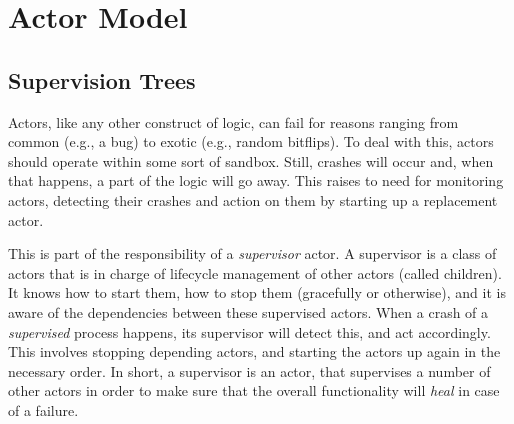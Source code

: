 \section{Actor Model}




\subsection{Supervision Trees}

Actors, like any other construct of logic, can fail for reasons ranging from common (e.g., a bug) to exotic (e.g., random bitflips). To deal with this, actors should operate within some sort of sandbox. Still, crashes will occur and, when that happens, a part of the logic will go away. This raises to need for monitoring actors, detecting their crashes and action on them by starting up a replacement actor.

This is part of the responsibility of a \textsl{supervisor} actor. A supervisor is a class of actors that is in charge of lifecycle management of other actors (called children). It knows how to start them, how to stop them (gracefully or otherwise), and it is aware of the dependencies between these supervised actors. When a crash of a \textsl{supervised} process happens, its supervisor will detect this, and act accordingly. This involves stopping depending actors, and starting the actors up again in the necessary order. In short, a supervisor is an actor, that supervises a number of other actors in order to make sure that the overall functionality will \textsl{heal} in case of a failure.



